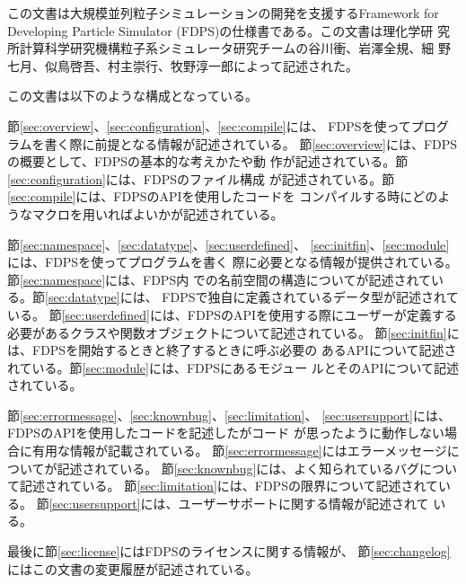 この文書は大規模並列粒子シミュレーションの開発を支援するFramework for
Developing Particle Simulator (FDPS)の仕様書である。この文書は理化学研
究所計算科学研究機構粒子系シミュレータ研究チームの谷川衝、岩澤全規、細
野七月、似鳥啓吾、村主崇行、牧野淳一郎によって記述された。

この文書は以下のような構成となっている。

節\ref{sec:overview}、\ref{sec:configuration}、\ref{sec:compile}には、
FDPSを使ってプログラムを書く際に前提となる情報が記述されている。
節\ref{sec:overview}には、FDPSの概要として、FDPSの基本的な考えかたや動
作が記述されている。節\ref{sec:configuration}には、FDPSのファイル構成
が記述されている。節\ref{sec:compile}には、FDPSのAPIを使用したコードを
コンパイルする時にどのようなマクロを用いればよいかが記述されている。

節\ref{sec:namespace}、\ref{sec:datatype}、\ref{sec:userdefined}、
\ref{sec:initfin}、\ref{sec:module}には、FDPSを使ってプログラムを書く
際に必要となる情報が提供されている。節\ref{sec:namespace}には、FDPS内
での名前空間の構造についてが記述されている。節\ref{sec:datatype}には、
FDPSで独自に定義されているデータ型が記述されている。
節\ref{sec:userdefined}には、FDPSのAPIを使用する際にユーザーが定義する
必要があるクラスや関数オブジェクトについて記述されている。
節\ref{sec:initfin}には、FDPSを開始するときと終了するときに呼ぶ必要の
あるAPIについて記述されている。節\ref{sec:module}には、FDPSにあるモジュー
ルとそのAPIについて記述されている。

節\ref{sec:errormessage}、\ref{sec:knownbug}、\ref{sec:limitation}、
\ref{sec:usersupport}には、FDPSのAPIを使用したコードを記述したがコード
が思ったように動作しない場合に有用な情報が記載されている。
節\ref{sec:errormessage}にはエラーメッセージについてが記述されている。
節\ref{sec:knownbug}には、よく知られているバグについて記述されている。
節\ref{sec:limitation}には、FDPSの限界について記述されている。
節\ref{sec:usersupport}には、ユーザーサポートに関する情報が記述されて
いる。

最後に節\ref{sec:license}にはFDPSのライセンスに関する情報が、
節\ref{sec:changelog}にはこの文書の変更履歴が記述されている。

